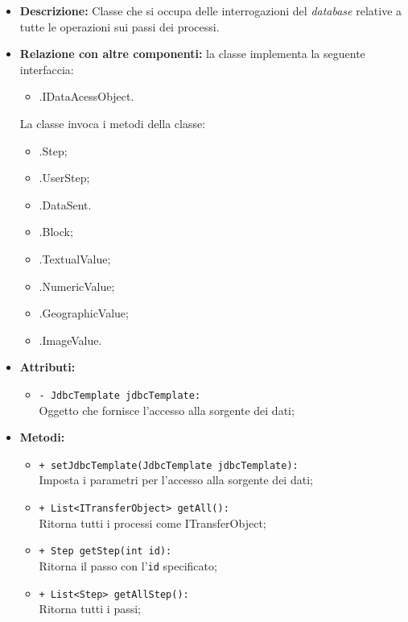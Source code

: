 \begin{flushleft}
\begin{itemize}
\item \textbf{Descrizione:} Classe che si occupa delle interrogazioni del \textit{database} relative a tutte le operazioni sui passi dei processi.
\item \textbf{Relazione con altre componenti:} la classe implementa la seguente interfaccia:
		\begin{itemize}
			\item \smodel{}.IDataAcessObject.
		\end{itemize}
		La classe invoca i metodi della classe:
		\begin{itemize}
			\item \smodel{}.Step;
			\item \smodel{}.UserStep;
			\item \smodel{}.DataSent.
			\item \smodel{}.Block;
			\item \smodel{}.TextualValue;
			\item \smodel{}.NumericValue;
			\item \smodel{}.GeographicValue;
			\item \smodel{}.ImageValue.			
		\end{itemize}\item \textbf{Attributi:}
\begin{sloppypar}
\begin{itemize}
\item \texttt{- JdbcTemplate jdbcTemplate:}\\ Oggetto che fornisce l'accesso alla sorgente dei dati;
\end{itemize}
\end{sloppypar}
\item \textbf{Metodi:}
\begin{sloppypar}
\begin{itemize}
\item \texttt{+ setJdbcTemplate(JdbcTemplate jdbcTemplate):}\\ Imposta i parametri per l'accesso alla sorgente dei dati;
\item \texttt{+ List<ITransferObject> getAll():}\\ Ritorna tutti i processi come ITransferObject; 
\item \texttt{+ Step getStep(int id):}\\ Ritorna il passo con l'\texttt{id} specificato; 
\item \texttt{+ List<Step> getAllStep():}\\ Ritorna tutti i passi;

\end{itemize}
\end{sloppypar}
\end{itemize}
\end{flushleft}
